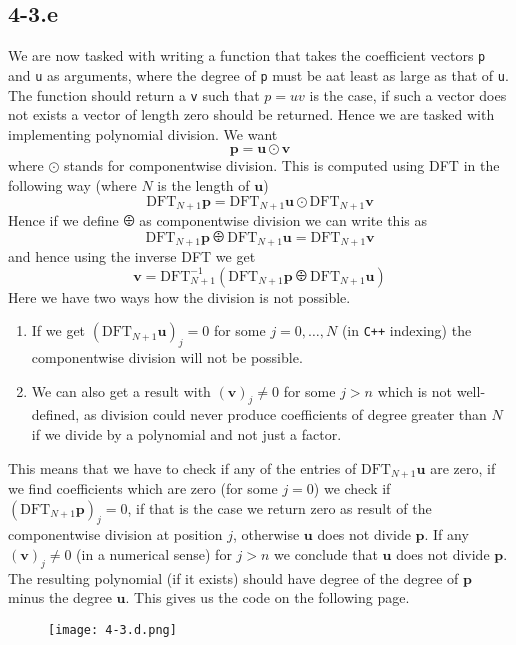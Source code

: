 \documentclass{article}
\begin{document}
\subsection*{4-3.e}
We are now tasked with writing a function that takes the coefficient vectors \verb|p| and \verb|u| as arguments, where the degree of \verb|p| must be aat least as large as that of \verb|u|. The function should return a \verb|v| such that $p = uv$ is the case, if such a vector does not exists a vector of length zero should be returned. Hence we are tasked with implementing polynomial division. We want
\begin{equation*}
    \mathbf{p} = \mathbf{u} \odot \mathbf{v}
\end{equation*}
where $\odot$ stands for componentwise division. This is computed using DFT in the following way (where $N$ is the length of $\mathbf{u}$)
\begin{equation*}
    \mathrm{DFT}_{N+1}\mathbf{p} = \mathrm{DFT}_{N+1}\mathbf{u} \odot \mathrm{DFT}_{N+1}\mathbf{v}
\end{equation*}
Hence if we define $\odiv$ as componentwise division we can write this as
\begin{equation*}
    \mathrm{DFT}_{N+1}\mathbf{p} \odiv \mathrm{DFT}_{N+1}\mathbf{u} = \mathrm{DFT}_{N+1}\mathbf{v} 
\end{equation*}
and hence using the inverse DFT we get
\begin{equation*}
    \mathbf{v} = \mathrm{DFT}^{-1}_{N+1}\left(\mathrm{DFT}_{N+1}\mathbf{p} \odiv \mathrm{DFT}_{N+1}\mathbf{u}\right)
\end{equation*}
Here we have two ways how the division is not possible.
\begin{enumerate}
    \item If we get $\left(\mathrm{DFT}_{N+1}\mathbf{u}\right)_{j} = 0$ for some $j=0, \dots, N$ (in \verb|C++| indexing) the componentwise division will not be possible.
    \item We can also get a result with $\left(\mathbf{v}\right)_{j} \neq 0$ for some $j > n$ which is not well-defined, as division could never produce coefficients of degree greater than $N$ if we divide by a polynomial and not just a factor.
\end{enumerate}
This means that we have to check if any of the entries of $\mathrm{DFT}_{N+1}\mathbf{u}$ are zero, if we find coefficients which are zero (for some $j=0$) we check if $ \left(\mathrm{DFT}_{N+1}\mathbf{p}\right)_{j} = 0$, if that is the case we return zero as result of the componentwise division at position $j$, otherwise $\mathbf{u}$ does not divide $\mathbf{p}$. If any $\left(\mathbf{v}\right)_{j} \neq 0$ (in a numerical sense) for $j > n$ we conclude that $\mathbf{u}$ does not divide $\mathbf{p}$. The resulting polynomial (if it exists) should have degree of the degree of $\mathbf{p}$ minus the degree $\mathbf{u}$. This gives us the code on the following page.

\pagebreak

\begin{figure}[!hbt]
    \centering
\texttt{[image: 4-3.d.png]}
\end{figure}
\end{document}
